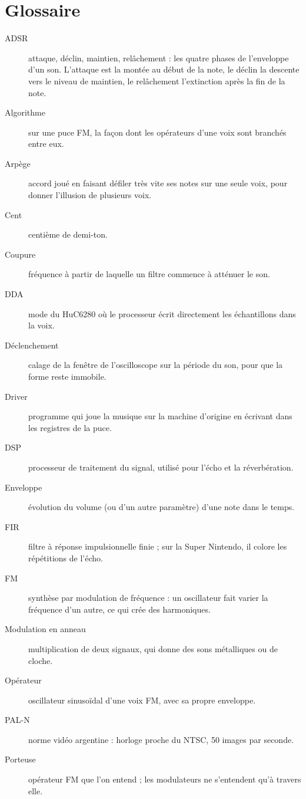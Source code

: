 \chapter{Glossaire}
\begin{description}
  \item[ADSR] attaque, déclin, maintien, relâchement : les quatre phases de l'enveloppe d'un son. L'attaque est la
        montée au début de la note, le déclin la descente vers le niveau de maintien, le relâchement l'extinction
        après la fin de la note.
  \item[Algorithme] sur une puce FM, la façon dont les opérateurs d'une voix sont branchés entre eux.
  \item[Arpège] accord joué en faisant défiler très vite ses notes sur une seule voix, pour donner l'illusion de
        plusieurs voix.
  \item[Cent] centième de demi-ton.
  \item[Coupure] fréquence à partir de laquelle un filtre commence à atténuer le son.
  \item[DDA] mode du HuC6280 où le processeur écrit directement les échantillons dans la voix.
  \item[Déclenchement] calage de la fenêtre de l'oscilloscope sur la période du son, pour que la forme reste
        immobile.
  \item[Driver] programme qui joue la musique sur la machine d'origine en écrivant dans les registres de la puce.
  \item[DSP] processeur de traitement du signal, utilisé pour l'écho et la réverbération.
  \item[Enveloppe] évolution du volume (ou d'un autre paramètre) d'une note dans le temps.
  \item[FIR] filtre à réponse impulsionnelle finie ; sur la Super Nintendo, il colore les répétitions de l'écho.
  \item[FM] synthèse par modulation de fréquence : un oscillateur fait varier la fréquence d'un autre, ce qui crée
        des harmoniques.
  \item[Modulation en anneau] multiplication de deux signaux, qui donne des sons métalliques ou de cloche.
  \item[Opérateur] oscillateur sinusoïdal d'une voix FM, avec sa propre enveloppe.
  \item[PAL-N] norme vidéo argentine : horloge proche du NTSC, 50 images par seconde.
  \item[Porteuse] opérateur FM que l'on entend ; les modulateurs ne s'entendent qu'à travers elle.

\end{description}
